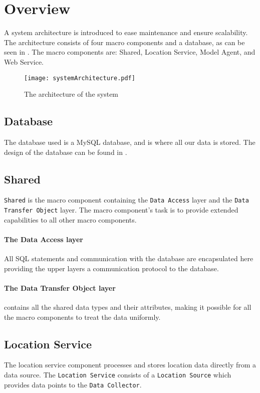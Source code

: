 \section{Overview}
A system architecture is introduced to ease maintenance and ensure scalability.
The architecture consists of four macro components and a database, as can be seen in . The macro components are: Shared, Location Service, Model Agent, and Web Service.

\begin{figure}[H]
\texttt{[image: systemArchitecture.pdf]}
\caption{The architecture of the system}
\label{fig:architecture}
\end{figure}


\subsection{Database} The database used is a MySQL database, and is where all our data is stored.
The design of the database can be found in .


\subsection{Shared}\texttt{Shared} is the macro component containing the \texttt{Data Access} layer and the \texttt{Data Transfer Object} layer.
The macro component's task is to provide extended capabilities to all other macro components.

\paragraph{The Data Access layer} All SQL statements and communication with the database are encapsulated here providing the upper layers a communication protocol to the database.

\paragraph{The Data Transfer Object layer} contains all the shared data types and their attributes, making it possible for all the macro components to treat the data uniformly.


\subsection{Location Service} 
The location service component processes and stores location data directly from a data source. 
The \texttt{Location Service} consists of a \texttt{Location Source} which provides data points to the \texttt{Data Collector}.

